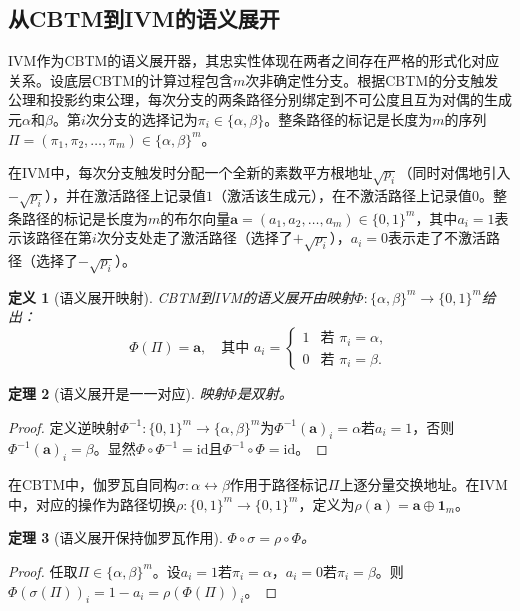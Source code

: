 \documentclass{ctexart}
\newtheorem{theorem}{定理}[section]
\newtheorem{definition}[theorem]{定义}
\newtheorem{proof}[theorem]{证明}
\begin{document}
	\subsection{从CBTM到IVM的语义展开}
	
	IVM作为CBTM的语义展开器，其忠实性体现在两者之间存在严格的形式化对应关系。设底层CBTM的计算过程包含$m$次非确定性分支。根据CBTM的分支触发公理和投影约束公理，每次分支的两条路径分别绑定到不可公度且互为对偶的生成元$\alpha$和$\beta$。第$i$次分支的选择记为$\pi_i \in \{\alpha, \beta\}$。整条路径的标记是长度为$m$的序列$\Pi = (\pi_1, \pi_2, \dots, \pi_m) \in \{\alpha, \beta\}^m$。
	
	在IVM中，每次分支触发时分配一个全新的素数平方根地址$\sqrt{p_i}$（同时对偶地引入$-\sqrt{p_i}$），并在激活路径上记录值$1$（激活该生成元），在不激活路径上记录值$0$。整条路径的标记是长度为$m$的布尔向量$\mathbf{a} = (a_1, a_2, \dots, a_m) \in \{0, 1\}^m$，其中$a_i = 1$表示该路径在第$i$次分支处走了激活路径（选择了$+\sqrt{p_i}$），$a_i = 0$表示走了不激活路径（选择了$-\sqrt{p_i}$）。
	
	\begin{definition}[语义展开映射]\label{def:semantic-unfolding}
		CBTM到IVM的语义展开由映射$\Phi: \{\alpha, \beta\}^m \to \{0,1\}^m$给出：
		\[
		\Phi(\Pi) = \mathbf{a}, \quad \text{其中 } a_i = 
		\begin{cases}
			1 & \text{若 } \pi_i = \alpha,\\
			0 & \text{若 } \pi_i = \beta.
		\end{cases}
		\]
	\end{definition}
	
	\begin{theorem}[语义展开是一一对应]\label{thm:phi-bijection}
		映射$\Phi$是双射。
	\end{theorem}
	\begin{proof}
		定义逆映射$\Phi^{-1}: \{0,1\}^m \to \{\alpha, \beta\}^m$为$\Phi^{-1}(\mathbf{a})_i = \alpha$若$a_i=1$，否则$\Phi^{-1}(\mathbf{a})_i = \beta$。显然$\Phi \circ \Phi^{-1} = \text{id}$且$\Phi^{-1} \circ \Phi = \text{id}$。
	\end{proof}
	
	在CBTM中，伽罗瓦自同构$\sigma: \alpha \leftrightarrow \beta$作用于路径标记$\Pi$上逐分量交换地址。在IVM中，对应的操作为路径切换$\rho: \{0,1\}^m \to \{0,1\}^m$，定义为$\rho(\mathbf{a}) = \mathbf{a} \oplus \mathbf{1}_m$。
	
	\begin{theorem}[语义展开保持伽罗瓦作用]\label{thm:phi-galois}
		$\Phi \circ \sigma = \rho \circ \Phi$。
	\end{theorem}
	\begin{proof}
		任取$\Pi \in \{\alpha, \beta\}^m$。设$a_i = 1$若$\pi_i = \alpha$，$a_i = 0$若$\pi_i = \beta$。则$\Phi(\sigma(\Pi))_i = 1-a_i = \rho(\Phi(\Pi))_i$。
	\end{proof}
	
\end{document}
